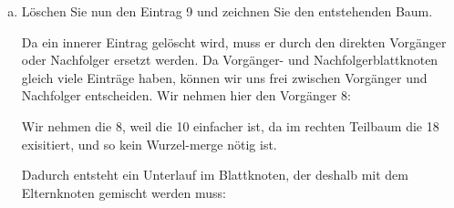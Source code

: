 \begin{enumerate}[a)]
\item Löschen Sie nun den Eintrag 9 und zeichnen Sie den entstehenden Baum.

\begin{solution}
Da ein innerer Eintrag gelöscht wird, muss er durch den direkten Vorgänger oder Nachfolger ersetzt werden.
Da Vorgänger- und Nachfolgerblattknoten gleich viele Einträge haben, können wir uns frei zwischen Vorgänger und Nachfolger entscheiden. Wir nehmen hier den Vorgänger 8:

\begin{note}
	Wir nehmen die 8, weil die 10 einfacher ist, da im rechten Teilbaum die 18 exisitiert, und so kein Wurzel-merge n\"otig ist.
\end{note}

\begin{center}
\end{center}


Dadurch entsteht ein Unterlauf im Blattknoten,
der deshalb mit dem Elternknoten gemischt werden muss:

\begin{center}
    \begin{tikzpicture}[
            start chain=0 going right,
            defaultNode/.style={defaultNode2},
        ]


\end{tikzpicture}
\end{center}
\end{solution}
\end{enumerate}
